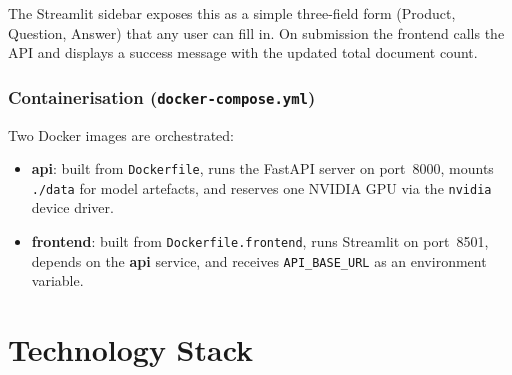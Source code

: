 \documentclass[12pt,a4paper]{article}
\begin{document}
The Streamlit sidebar exposes this as a simple three-field form (Product,
Question, Answer) that any user can fill in.  On submission the frontend calls
the API and displays a success message with the updated total document count.

\subsubsection{Containerisation (\texttt{docker-compose.yml})}

Two Docker images are orchestrated:

\begin{itemize}
  \item \textbf{api}: built from \texttt{Dockerfile}, runs the FastAPI server on
        port~8000, mounts \texttt{./data} for model artefacts, and reserves one
        NVIDIA GPU via the \texttt{nvidia} device driver.
  \item \textbf{frontend}: built from \texttt{Dockerfile.frontend}, runs Streamlit
        on port~8501, depends on the \textbf{api} service, and receives
        \texttt{API\_BASE\_URL} as an environment variable.
\end{itemize}

\section{Technology Stack}
\end{document}
